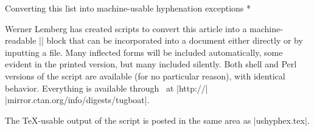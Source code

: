 \head * Converting this list into machine-usable \break hyphenation exceptions *

Werner Lemberg has created scripts to convert this article into a
machine-readable |\hyphenation| block that can be incorporated into a
document either directly or by inputting a file.  Many inflected forms
will be included automatically, some evident in the printed version, but
many included silently.  Both shell and Perl versions of the script are
available (for no particular reason), with identical behavior.
Everything is available through \CTAN\ at
|http://| |mirror.ctan.org/info/digests/tugboat|.

The \TeX-usable output of the script is posted in the same area as
|ushyphex.tex|.



\def\printhyphens#1{%
 \setbox0\vbox{%
  \pretolerance-1\hyphenpenalty-10000%
  \hsize0pt\leftskip0pt\rightskip0pt\parfillskip0pt%
  \hbadness100\hfuzz\maxdimen
  \offinterlineskip
  \interlinepenalty0\clubpenalty0\widowpenalty0\brokenpenalty0%
  \noindent\hskip0pt #1\par
  \setbox0\lastbox \global\setbox1\hbox{\hbox{\unhbox0}}%
  \loop \unskip \setbox0\lastbox \ifhbox0%
   \global\setbox1\hbox{\hbox{\unhbox0}\discretionary{}{}{}\unhbox1}%
  \repeat}%
}

%
%
%
%
%

